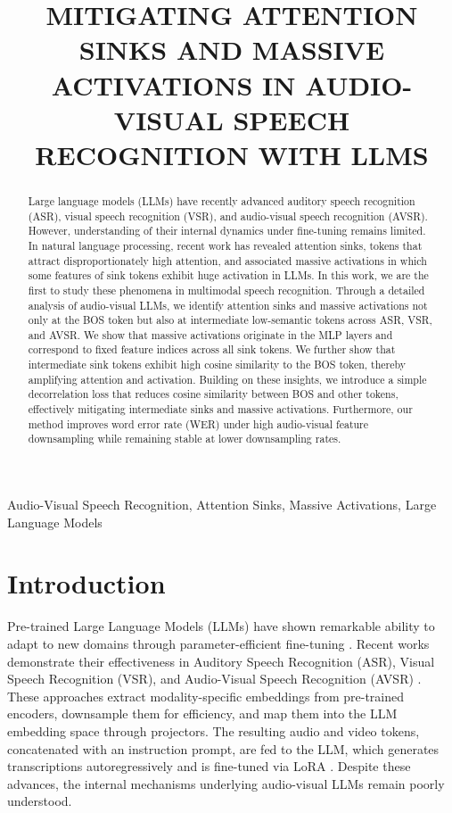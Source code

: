 \documentclass{article}
\title{MITIGATING ATTENTION SINKS AND MASSIVE ACTIVATIONS IN AUDIO-VISUAL SPEECH RECOGNITION WITH LLMS}
\begin{document}
\ninept
\maketitle
\begin{abstract}
Large language models (LLMs) have recently advanced auditory speech recognition (ASR), visual speech recognition (VSR), and audio-visual speech recognition (AVSR). However, understanding of their internal dynamics under fine-tuning remains limited. In natural language processing, recent work has revealed attention sinks, tokens that attract disproportionately high attention, and associated massive activations in which some features of sink tokens exhibit huge activation in LLMs. In this work, we are the first to study these phenomena in multimodal speech recognition. Through a detailed analysis of audio-visual LLMs, we identify attention sinks and massive activations not only at the BOS token but also at intermediate low-semantic tokens across ASR, VSR, and AVSR. We show that massive activations originate in the MLP layers and correspond to fixed feature indices across all sink tokens. We further show that intermediate sink tokens exhibit high cosine similarity to the BOS token, thereby amplifying attention and activation. Building on these insights, we introduce a simple decorrelation loss that reduces cosine similarity between BOS and other tokens, effectively mitigating intermediate sinks and massive activations. Furthermore, our method improves word error rate (WER) under high audio-visual feature downsampling while remaining stable at lower downsampling rates.
\end{abstract}
\begin{keywords} 
Audio-Visual Speech Recognition, Attention Sinks, Massive Activations, Large Language Models
\end{keywords}
\section{Introduction}
\label{sec:intro}
Pre-trained Large Language Models (LLMs) have shown remarkable ability to adapt to new domains through parameter-efficient fine-tuning \cite{li2023blip, gao2023llama, fathullah2024prompting, ma2024embarrassingly, maaz2023video, chen2024llast, zang2025contextual}. Recent works demonstrate their effectiveness in Auditory Speech Recognition (ASR), Visual Speech Recognition (VSR), and Audio-Visual Speech Recognition (AVSR) \cite{cappellazzo2025large, thomas2025vallr, yeo2024visual, cappellazzo2025adaptive, yeo2025mms, llama-SMoP, yeo2025zero, cappellazzo2025mome, cappellazzo2025omni}. These approaches extract modality-specific embeddings from pre-trained encoders, downsample them for efficiency, and map them into the LLM embedding space through projectors. The resulting audio and video tokens, concatenated with an instruction prompt, are fed to the LLM, which generates transcriptions autoregressively and is fine-tuned via LoRA \cite{hu2022lora}. Despite these advances, the internal mechanisms underlying audio-visual LLMs remain poorly understood.
\end{document}
